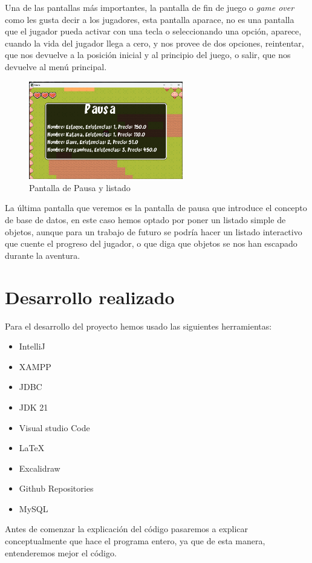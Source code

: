 \documentclass[a4paper]{article}
\begin{document}
Una de las pantallas más importantes, la pantalla de fin de juego o \textit{game over} como les gusta decir a los jugadores, esta pantalla aparace,  no es una pantalla que el jugador pueda activar con una tecla o seleccionando una opción, aparece, cuando la vida del jugador llega a cero, y nos provee de dos opciones,
reintentar, que nos devuelve a la posición inicial y al principio del juego, o salir, que nos devuelve al menú principal.\\
\begin{figure}[!ht]
    \centering
    \includegraphics[width=0.6\textwidth]{Images/pantalla6tfg.png}
    \caption{Pantalla de Pausa y listado}
    \label{fig:pantalla6}
\end{figure}
La última pantalla que veremos es la pantalla de pausa que introduce el concepto de base de datos, en este caso hemos optado por poner un listado simple de objetos, aunque para un trabajo de futuro se podría hacer un listado interactivo que cuente el progreso del jugador, o que diga que objetos se nos han escapado durante la aventura.

\clearpage
\section{Desarrollo realizado}
Para el desarrollo del proyecto hemos usado las siguientes herramientas:
\begin{itemize}
    \item IntelliJ
    \item XAMPP
    \item JDBC
    \item JDK 21
    \item Visual studio Code
    \item \LaTeX
    \item Excalidraw
    \item Github Repositories
    \item MySQL
\end{itemize}
Antes de comenzar la explicación del código pasaremos a explicar conceptualmente que hace el programa entero, ya que de esta manera, entenderemos mejor el código.
\end{document}
